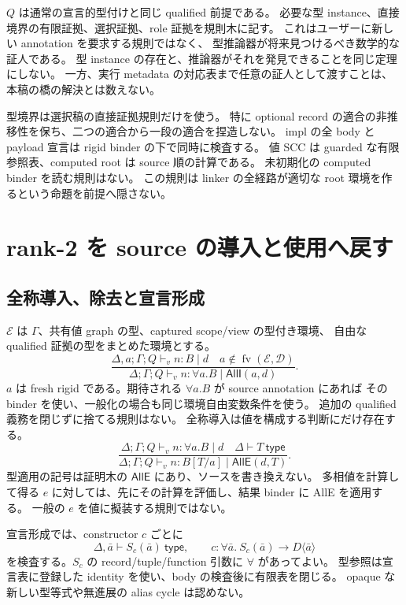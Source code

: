 \documentclass[11pt,a4paper]{article}
\newcommand{\fv}{\operatorname{fv}}
\newcommand{\D}{\mathcal D}
\begin{document}
\(Q\) は通常の宣言的型付けと同じ qualified 前提である。
必要な型 instance、直接境界の有限証拠、選択証拠、role 証拠を規則木に記す。
これはユーザーに新しい annotation を要求する規則ではなく、
型推論器が将来見つけるべき数学的な証人である。
型 instance の存在と、推論器がそれを発見できることを同じ定理にしない。
一方、実行 metadata の対応表まで任意の証人として渡すことは、本稿の橋の解決とは数えない。

型境界は選択稿の直接証拠規則だけを使う。
特に optional record の適合の非推移性を保ち、二つの適合から一段の適合を捏造しない。
impl の全 body と payload 宣言は rigid binder の下で同時に検査する。
値 SCC は guarded な有限参照表、computed root は source 順の計算である。
未初期化の computed binder を読む規則はない。
この規則は linker の全経路が適切な root 環境を作るという命題を前提へ隠さない。

\section{rank-2 を source の導入と使用へ戻す}
\label{sec:poly}

\subsection{全称導入、除去と宣言形成}

\(\mathcal E\) は \(\Gamma\)、共有値 graph の型、captured scope/view の型付き環境、
自由な qualified 証拠の型をまとめた環境とする。
\[
 \frac{\Delta,a;\Gamma;Q\vdash_v n:B\mid d
       \quad a\notin\fv(\mathcal E,\D)}
      {\Delta;\Gamma;Q\vdash_v n:\forall a.B\mid\mathsf{AllI}(a,d)}.
 \tag{S-AllI}
\]
\(a\) は fresh rigid である。期待される \(\forall a.B\) が source annotation にあれば
その binder を使い、一般化の場合も同じ環境自由変数条件を使う。
追加の qualified 義務を閉じずに捨てる規則はない。
全称導入は値を構成する判断にだけ存在する。
\[
 \frac{\Delta;\Gamma;Q\vdash_v n:\forall a.B\mid d\quad\Delta\vdash T\ \mathsf{type}}
      {\Delta;\Gamma;Q\vdash_v n:B[T/a]\mid\mathsf{AllE}(d,T)}.
 \tag{S-AllE}
\]
型適用の記号は証明木の \(\mathsf{AllE}\) にあり、ソースを書き換えない。
多相値を計算して得る \(e\) に対しては、先にその計算を評価し、結果 binder に AllE を適用する。
一般の \(e\) を値に擬装する規則ではない。

宣言形成では、constructor \(c\) ごとに
\[
 \Delta,\bar a\vdash S_c(\bar a)\ \mathsf{type},\qquad
 c:\forall\bar a.\ S_c(\bar a)\longrightarrow D\langle\bar a\rangle
 \tag{S-Decl}
\]
を検査する。\(S_c\) の record/tuple/function 引数に \(\forall\) があってよい。
型参照は宣言表に登録した identity を使い、body の検査後に有限表を閉じる。
opaque な新しい型等式や無進展の alias cycle は認めない。
\end{document}
